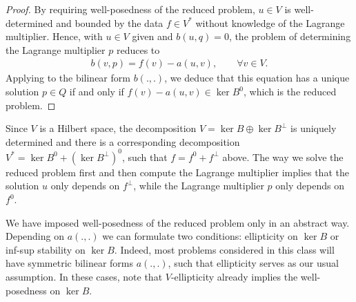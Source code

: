 \begin{proof}
  By requiring well-posedness of the reduced problem, $u\in V$ is
  well-determined and bounded by the data $f\in V^*$ without knowledge
  of the Lagrange multiplier. Hence, with $u\in V$ given and
  $b(u,q) = 0$, the problem of determining the Lagrange multiplier $p$
  reduces to
  \begin{gather}
    b(v,p) = f(v) - a(u,v), \qquad\forall v\in V.
  \end{gather}
  Applying  to the
  bilinear form $b(.,.)$, we deduce that this equation has a unique
  solution $p\in Q$ if and only if $f(v)-a(u,v) \in \ker B^0$, which
  is the reduced problem.
\end{proof}

\begin{remark}
  Since $V$ is a Hilbert space, the decomposition
  $V = \ker B \oplus \ker B^\perp$ is uniquely determined and there is
  a corresponding decomposition $V^* = \ker B^0+(\ker B^\perp)^0$,
  such that $f = f^0+f^\perp$ above. The way we solve the reduced
  problem first and then compute the Lagrange multiplier implies that
  the solution $u$ only depends on $f^\perp$, while the Lagrange
  multiplier $p$ only depends on $f^0$.
\end{remark}

\begin{remark}
  We have imposed well-posedness of the reduced problem only in an
  abstract way. Depending on $a(.,.)$ we can formulate two conditions:
  ellipticity on $\ker B$ or inf-sup stability on $\ker B$. Indeed,
  most problems considered in this class will have symmetric bilinear
  forms $a(.,.)$, such that ellipticity serves as our usual
  assumption.  In these cases, note that $V$-ellipticity already
  implies the well-posedness on $\ker B$.
\end{remark}

